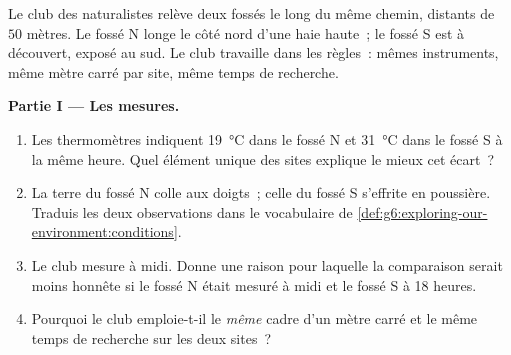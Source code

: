 \begin{problem}\label{pb:g6:exploring-our-environment:1}
Le club des naturalistes relève deux fossés le long du même chemin,
distants de $50$ mètres. Le fossé N longe le côté nord d'une haie
haute~; le fossé S est à découvert, exposé au sud. Le club travaille
dans les règles~: mêmes instruments, même mètre carré par site, même
temps de recherche.

\medskip\noindent\textbf{Partie I --- Les mesures.}
\begin{enumerate}
  \item Les thermomètres indiquent \qty{19}{\degreeCelsius} dans le
        fossé N et \qty{31}{\degreeCelsius} dans le fossé S à la
        même heure. Quel élément unique des sites explique le mieux
        cet écart~?
  \item La terre du fossé N colle aux doigts~; celle du fossé S
        s'effrite en poussière. Traduis les deux observations dans
        le vocabulaire de
        \cref{def:g6:exploring-our-environment:conditions}.
  \item Le club mesure à midi. Donne une raison pour laquelle la
        comparaison serait moins honnête si le fossé N était mesuré
        à midi et le fossé S à 18 heures.
  \item Pourquoi le club emploie-t-il le \emph{même} cadre d'un
        mètre carré et le même temps de recherche sur les deux
        sites~?
\end{enumerate}


\end{problem}
